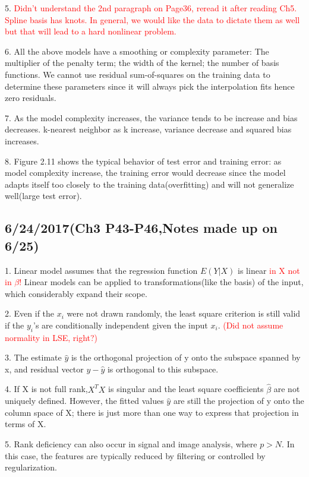 \documentclass[a4paper, 12pt]{article}
\begin{document}
5.  \textcolor{red}{ 
Didn't understand the 2nd paragraph on Page36, reread it after reading Ch5. Spline basis has knots. In general, we would like the data to dictate them as well but that will lead to a hard nonlinear problem.
}

6. All the above models have a smoothing or complexity parameter: The multiplier of the penalty term; the width of the kernel; the number of basis functions. We cannot use residual sum-of-squares on the training data to determine these parameters since it will always pick the interpolation fits hence zero residuals.

7. As the model complexity increases, the variance tends to be increase and bias decreases. k-nearest neighbor as k increase, variance decrease and squared bias increases.

8. Figure 2.11 shows the typical behavior of test error and training error: as model complexity increase, the training error would decrease since the model adapts itself too closely to the training data(overfitting) and will not generalize well(large test error).

\subsection*{6/24/2017(Ch3 P43-P46,Notes made up on 6/25)}

1. Linear model assumes that the regression function $E(Y|X)$ is linear \textcolor{red}{  in X not in $\beta$! } Linear models can be applied to transformations(like the basis) of the input, which considerably expand their scope.

2. Even if the $x_i$ were not drawn randomly, the least square criterion is still valid if the $y_i$'s are conditionally independent given the input $x_i$.\textcolor{red}{ (Did not assume normality in LSE, right?) }

3. The estimate $\hat{y}$ is the orthogonal projection of y onto the subspace spanned by x, and residual vector $y-\hat{y}$ is orthogonal to this subspace.

4. If X is not full rank,$X^TX$ is singular and the least square coefficients $\hat{\beta}$ are not uniquely defined. However, the fitted values $\hat{y}$ are still the projection of y onto the column space of X; there is just more than one way to express that projection in terms of X.

5. Rank deficiency can also occur in signal and image analysis, where $p>N$. In this case, the features are typically reduced by filtering or controlled by regularization.
\end{document}
